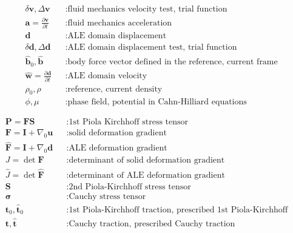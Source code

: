 \documentclass[a4paper,12pt]{report}
\begin{document}
\begin{equation}
\begin{aligned}
&\delta\boldsymbol{v}, \Delta\boldsymbol{v} &&: \text{fluid mechanics velocity test, trial function} \\
&\boldsymbol{a}=\frac{\partial\boldsymbol{v}}{\partial t} &&: \text{fluid mechanics acceleration} \\
&\boldsymbol{d} &&: \text{ALE domain displacement} \\
&\delta\boldsymbol{d}, \Delta\boldsymbol{d} &&: \text{ALE domain displacement test, trial function} \\
&\hat{\boldsymbol{b}}_0, \hat{\boldsymbol{b}} &&: \text{body force vector defined in the reference, current frame} \\
&\widehat{\boldsymbol{w}}=\frac{\partial\boldsymbol{d}}{\partial t} &&: \text{ALE domain velocity} \\
&\rho_0, \rho &&: \text{reference, current density} \\
&\phi, \mu &&: \text{phase field, potential in Cahn-Hilliard equations}
\end{aligned}
\end{equation}

\begin{equation}
\nonumber
\begin{aligned}
&\boldsymbol{P}=\boldsymbol{F}\boldsymbol{S} &&: \text{1st Piola Kirchhoff stress tensor} \\
&\boldsymbol{F}=\boldsymbol{I}+\nabla_{0}\boldsymbol{u} &&: \text{solid deformation gradient} \\
&\widehat{\boldsymbol{F}}=\boldsymbol{I}+\nabla_{0}\boldsymbol{d} &&: \text{ALE deformation gradient} \\
&J=\det \boldsymbol{F} &&: \text{determinant of solid deformation gradient} \\
&\widehat{J}=\det \widehat{\boldsymbol{F}} &&: \text{determinant of ALE deformation gradient} \\
&\boldsymbol{S} &&: \text{2nd Piola-Kirchhoff stress tensor} \\
&\boldsymbol{\sigma} &&: \text{Cauchy stress tensor} \\
&\boldsymbol{t}_0, \hat{\boldsymbol{t}}_{0} &&: \text{1st Piola-Kirchhoff traction, prescribed 1st Piola-Kirchhoff traction} \\
&\boldsymbol{t}, \hat{\boldsymbol{t}} &&: \text{Cauchy traction, prescribed Cauchy traction}
\end{aligned}
\end{equation}

\newpage

\end{document}
